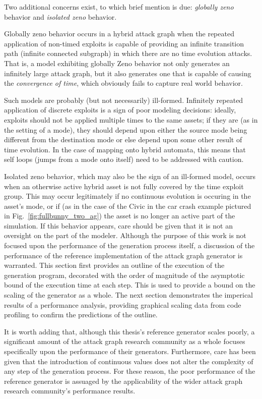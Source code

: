 Two additional concerns exist, to which brief mention is due: \emph{globally 
zeno} behavior and \emph{isolated zeno} behavior.

Globally zeno behavior occurs in a hybrid attack graph when the
repeated application of non-timed exploits is capable of providing an infinite
transition path (infinite connected subgraph) in which there are no time 
evolution attacks. That is, a model exhibiting globally Zeno behavior not only
generates an infinitely large attack graph, but it also generates one that is
capable of causing the \emph{convergence of time}, which obviously fails to
capture real world behavior.

Such models are probably (but
not necessarily) ill-formed. Infinitely repeated application of discrete
exploits is a sign of poor modeling decisions: ideally, exploits should not be
applied multiple times to the same assets; if they are (as in the setting of a
mode), they should depend upon either the source mode being different from the
destination mode or else depend upon some other result of time evolution. In the
case of mapping onto hybrid automata, this means that self loops (jumps from a
mode onto itself) need to be addressed with caution.

Isolated zeno behavior, which may also be the sign of an ill-formed model, 
occurs when an otherwise active hybrid asset is not fully covered by the time
exploit group. This may occur legitimately if no continuous evolution is
occuring in the asset's mode, or if (as in the case of the Civic in the
car crash example pictured in Fig.~\ref{fig:fullbunny_two_ag}) the asset is
no longer an active part of the simulation. If this behavior appears, care 
should be given that it is not an oversight on the part of the modeler.
Although the purpose of this work is not focused upon the performance of the
generation process itself, a discussion of the performance of the reference
implementation of the attack graph generator is warranted. This section first
provides an outline of the execution of the generation program, decorated with
the order of magnitude of the asymptotic bound of the execution time at
each step. This is used to provide a bound on the scaling of the generator as
a whole. The next section demonstrates the imperical results of a performance
analysis, providing graphical scaling data from code profiling
to confirm the predictions of the outline.

It is worth adding that, although this thesis's reference generator scales 
poorly, a significant amount of the attack graph research community as a whole
focuses specifically upon the performance of their generators. Furthermore, care
has been given that the introduction of continuous values does not alter the
complexity of any step of the generation process. For these reason,
the poor performance of the reference generator is assuaged by the applicability
of the wider attack graph research community's performance results.

